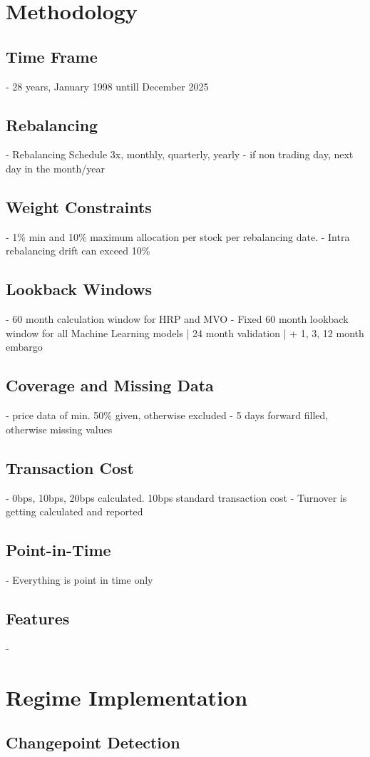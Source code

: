 \documentclass[12pt]{article}
\begin{document}
\section{Methodology}
\subsection{Time Frame}
- 28 years, January 1998 untill December 2025
\subsection{Rebalancing}
- Rebalancing Schedule 3x, monthly, quarterly, yearly
- if non trading day, next day in the month/year
\subsection{Weight Constraints}
- 1\% min and 10\% maximum allocation per stock per rebalancing date. 
- Intra rebalancing drift can exceed 10\%
\subsection{Lookback Windows}
- 60 month calculation window for HRP and MVO
- Fixed 60 month lookback window for all Machine Learning models | 24 month validation | + 1, 3, 12 month embargo
\subsection{Coverage and Missing Data}
- price data of min. 50\% given, otherwise excluded
- 5 days forward filled, otherwise missing values
\subsection{Transaction Cost}
- 0bps, 10bps, 20bps calculated. 10bps standard transaction cost
- Turnover is getting calculated and reported
\subsection{Point-in-Time}
- Everything is point in time only 
\subsection{Features}
- 

\section{Regime Implementation}
\subsection{Changepoint Detection}
\end{document}
